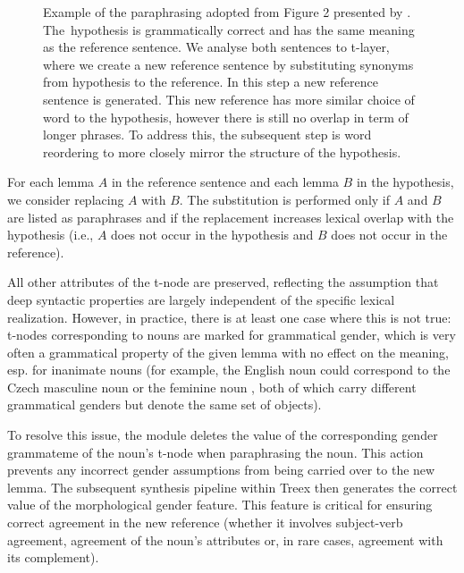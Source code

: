 \begin{figure}[!htb]
\begin{center}
\caption{Example of the paraphrasing adopted from Figure 2 presented by \cite{barancikova-rosa-2015-targeted}. The~hypothesis is grammatically correct and has the same meaning as the reference sentence. We analyse both sentences to t-layer, where we create a new reference sentence by substituting synonyms from hypothesis to the reference. In this step a new reference sentence  is generated. This new reference has more similar choice of word to the hypothesis, however there is still no overlap in term of longer phrases. To address this, the subsequent step is word reordering to more closely mirror the structure of the hypothesis.} 
\label{fig:example2}
\end{center}
\end{figure}

For each lemma $A$ in the reference sentence and each lemma $B$ in the hypothesis, we consider replacing $A$ with $B$. The substitution is performed only if $A$ and $B$ are listed as paraphrases and if the replacement increases lexical overlap with the hypothesis (i.e., $A$ does not occur in the hypothesis and $B$ does not occur in the reference). 

All other attributes of the t-node are preserved, reflecting the assumption that deep syntactic properties are largely independent of the specific lexical realization. However, in practice, there is at least one case where this is not true: t-nodes corresponding to nouns are marked for grammatical gender, which is very often a grammatical property of the given lemma with no effect on the meaning, esp. for inanimate nouns (for example, the English noun  could correspond to the Czech masculine noun  or the feminine noun , both of which carry different grammatical genders but denote the same set of objects). 

To resolve this issue, the module deletes the value of the corresponding gender grammateme of the noun's t-node when paraphrasing the noun. This action prevents any incorrect gender assumptions from being carried over to the new lemma. The subsequent synthesis pipeline within Treex then generates the correct value of the morphological gender feature. This feature is critical for ensuring correct agreement in the new reference (whether it involves subject-verb agreement, agreement of the noun's attributes or, in rare cases, agreement with its complement).

